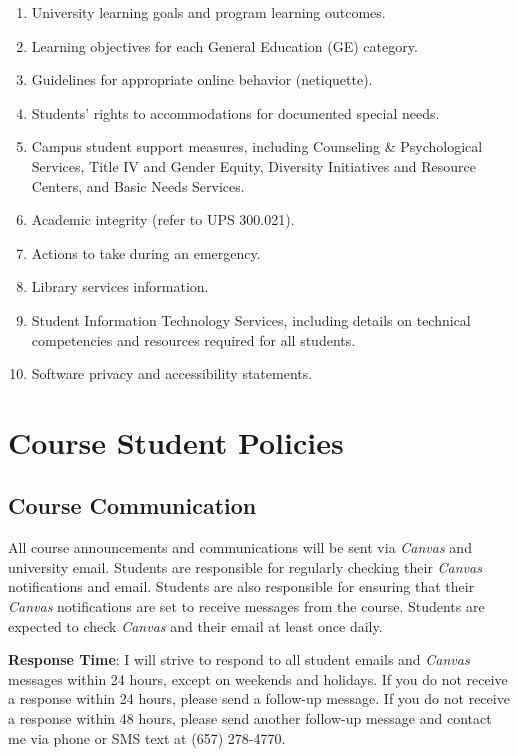 \documentclass[12pt, letterpaper]{article}
\begin{document}
\begin{enumerate}
    \item   University learning goals and program learning outcomes.
    \item	Learning objectives for each General Education (GE) category.
    \item	Guidelines for appropriate online behavior (netiquette).
    \item	Students’ rights to accommodations for documented special needs.
    \item   Campus student support measures, including Counseling \& Psychological Services, Title IV and Gender Equity, Diversity Initiatives and Resource Centers, and Basic Needs Services.
    \item	Academic integrity (refer to UPS 300.021).
    \item	Actions to take during an emergency.
    \item	Library services information.
    \item	Student Information Technology Services, including details on technical competencies and resources required for all students.
    \item	Software privacy and accessibility statements.
\end{enumerate}

\section{Course Student Policies}

\subsection*{Course Communication}
All course announcements and communications will be sent via \emph{Canvas} and university email. Students are responsible for regularly checking their \emph{Canvas} notifications and email. Students are also responsible for ensuring that their \emph{Canvas} notifications are set to receive messages from the course. Students are expected to check \emph{Canvas} and their email at least once daily.

\textbf{Response Time}: I will strive to respond to all student emails and \emph{Canvas} messages within 24 hours, except on weekends and holidays. If you do not receive a response within 24 hours, please send a follow-up message. If you do not receive a response within 48 hours, please send another follow-up message and contact me via phone or SMS text at (657) 278-4770.
\end{document}

